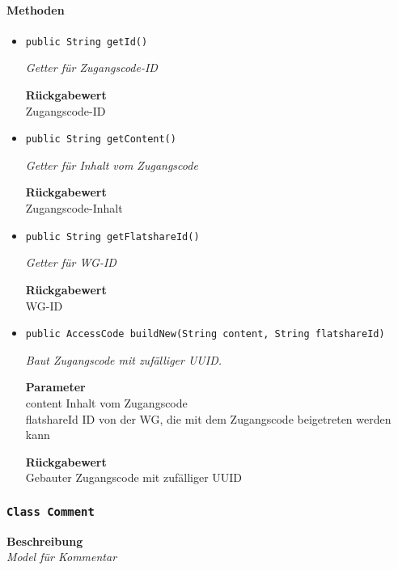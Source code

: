      \paragraph*{Methoden}
     \begin{itemize}
     	\item{\texttt{public String getId()}}
     	
     	\textit{Getter für Zugangscode-ID}
     	
     	
     	
     	\textbf{Rückgabewert} \\
     	Zugangscode-ID        \item{\texttt{public String getContent()}}
     	
     	\textit{Getter für Inhalt vom Zugangscode}
     	
     	
     	
     	\textbf{Rückgabewert} \\
     	Zugangscode-Inhalt        \item{\texttt{public String getFlatshareId()}}
     	
     	\textit{Getter für WG-ID}
     	
     	
     	
     	\textbf{Rückgabewert} \\
     	WG-ID        \item{\texttt{public AccessCode buildNew(String content, String flatshareId)}}
     	
     	\textit{Baut Zugangscode mit zufälliger UUID.}
     	
     	\textbf{Parameter} \\
     	content Inhalt vom Zugangscode\\
     	flatshareId ID von der WG, die mit dem Zugangscode beigetreten werden kann
     	
     	\textbf{Rückgabewert} \\
     	Gebauter Zugangscode mit zufälliger UUID
     \end{itemize}
     \subsubsection{\texttt{Class Comment}}
     \textbf{Beschreibung} \\
     \textit{Model für Kommentar}
